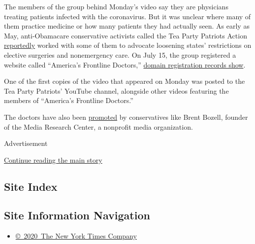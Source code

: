 The members of the group behind Monday's video say they are physicians
treating patients infected with the coronavirus. But it was unclear
where many of them practice medicine or how many patients they had
actually seen. As early as May, anti-Obamacare conservative activists
called the Tea Party Patriots Action
\href{https://news.bloomberglaw.com/health-law-and-business/hospitals-doctors-get-conservatives-push-for-elective-care}{reportedly}
worked with some of them to advocate loosening states' restrictions on
elective surgeries and nonemergency care. On July 15, the group
registered a website called ``America's Frontline Doctors,''
\href{https://whois.domaintools.com/americasfrontlinedoctors.com}{domain
registration records show}.

One of the first copies of the video that appeared on Monday was posted
to the Tea Party Patriots' YouTube channel, alongside other videos
featuring the members of ``America's Frontline Doctors.''

The doctors have also been
\href{https://twitter.com/daveyalba/status/1287933609433804802}{promoted}
by conservatives like Brent Bozell, founder of the Media Research
Center, a nonprofit media organization.

Advertisement

\protect\hyperlink{after-bottom}{Continue reading the main story}

\hypertarget{site-index}{%
\subsection{Site Index}\label{site-index}}

\hypertarget{site-information-navigation}{%
\subsection{Site Information
Navigation}\label{site-information-navigation}}

\begin{itemize}
\tightlist
\item
  \href{https://help.nytimes.com/hc/en-us/articles/115014792127-Copyright-notice}{©~2020~The
  New York Times Company}
\end{itemize}

